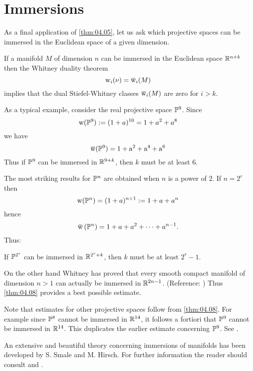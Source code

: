 \documentclass[../main]{subfiles}
\begin{document}
\section{Immersions}\label{sec:4.3}

As a final application of \ref{thm:04.05}, let us ask which projective spaces can be immersed in the Euclidean space of a given dimension.

If a manifold $M$ of dimension $n$ can be immersed in the Euclidean space $\mathbb R^{n+k}$ then the Whitney duality theorem
\[
\sw_{i}(\nu)=\xoverline{\sw}_{i}(M)
\]
implies that the dual Stiefel-Whitney classes $\xoverline{\sw}_{i}(M)$ are zero for $i>k$.

As a typical example, consider the real projective space $\mathbb{P}^{9}$. Since
\[
\operatorname{w}(\mathbb{P}^{9}):=(1+a)^{10}=1+a^{2}+a^{8}
\]
we have
\[
\xoverline{\sw}(\projective^{9})=1+\mathrm{a}^{2}+\mathrm{a}^{4}+\mathrm{a}^{6}
\]
Thus if $\mathbb{P}^{9}$ can be immersed in $\mathbb R^{9+k}$, then $k$ must be at least $6$.

The most striking results for $\mathbb{P}^{n}$ are obtained when $n$ is a power of $2$. If $n=2^{r}$ then
\[
\operatorname{w}(\mathbb{P}^{n})=(1+a)^{n+1}:=1+a+a^{n}
\]
hence
\[
\xoverline{\sw}\left(\projective^{n}\right)=1+a+a^{2}+\dots+a^{n-1}.
\]
Thus:
\begin{theorem}\label{thm:04.08}
	If $\mathbb{P}^{2^{r}}$ can be immersed in $\mathbb R^{2^{r}+k}$, then $k$ must be at least $2^{r}-1$.
\end{theorem}

On the other hand Whitney has proved that every smooth compact manifold of dimension $n>1$ can actually be immersed in $\mathbb R^{2 n-1}$. (Reference: \cite{whitney1944}) Thus \ref{thm:04.08} provides a best possible estimate.

Note that estimates for other projective spaces follow from \ref{thm:04.08}. For example since $\mathbb{P}^{8}$ cannot be immersed in $\mathbb R^{14}$, it follows a fortiori that $\mathbb{P}^{9}$ cannot be immersed in $\mathbb R^{14}$. This duplicates the earlier estimate concerning $\mathbb{P}^{9}$. See \cite{james1971}.

An extensive and beautiful theory concerning immersions of manifolds has been developed by S. Smale and M. Hirsch. For further information the reader should consult \cite{hirsch1959} and \cite{smale1959}.
\end{document}
